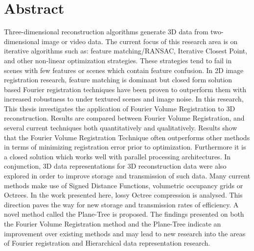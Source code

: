 \makeatletter
\chapter{Abstract}

Three-dimensional reconstruction algorithms generate 3D data from two-dimensional image or video data. The current focus of this research area is on iterative algorithms such as: feature matching/RANSAC, Iterative Closest Point, and other non-linear optimization strategies. These strategies tend to fail in scenes with few features or scenes which contain feature confusion. In 2D image registration research, feature matching is dominant but closed form solution based Fourier registration techniques have been proven to outperform them with increased robustness to under textured scenes and image noise. In this research, This thesis investigates the application of Fourier Volume Registration to 3D reconstruction. Results are compared between Fourier Volume Registration, and several current techniques both quantitatively and qualitatively. Results show that the Fourier Volume Registration Technique often outperforms other methods in terms of minimizing registration error prior to optimization. Furthermore it is a closed solution which works well with parallel processing architectures. In conjunction, 3D data representations for 3D reconstruction data were also explored in order to improve storage and transmission of such data. Many current methods make use of Signed Distance Functions, volumetric occupancy grids or Octrees. In the work presented here, lossy Octree compression is analysed. This direction paves the way for new storage and transmission rates of efficiency. A novel method called the Plane-Tree is proposed. The findings presented on both the Fourier Volume Registration method and the Plane-Tree indicate an improvement over existing methods and may lead to new research into the areas of Fourier registration and Hierarchical data representation research.



